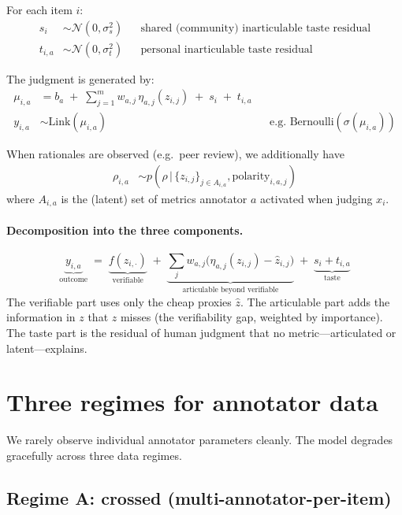 \documentclass[11pt]{article}
\newcommand{\given}{\,|\,}
\begin{document}
For each item $i$:
\begin{align}
s_i &\sim \mathcal{N}(0, \sigma_s^2) && \text{shared (community) inarticulable taste residual} \\
t_{i,a} &\sim \mathcal{N}(0, \sigma_t^2) && \text{personal inarticulable taste residual}
\end{align}

The judgment is generated by:
\begin{align}
\mu_{i,a} &= b_a \;+\; \sum_{j=1}^m w_{a,j}\,\eta_{a,j}(z_{i,j}) \;+\; s_i \;+\; t_{i,a} \\
y_{i,a} &\sim \text{Link}(\mu_{i,a}) && \text{e.g.\ Bernoulli}(\sigma(\mu_{i,a}))
\end{align}

When rationales are observed (e.g.\ peer review), we additionally have
\begin{align}
\rho_{i,a} &\sim p(\rho \given \{z_{i,j}\}_{j \in A_{i,a}}, \text{polarity}_{i,a,j})
\end{align}
where $A_{i,a}$ is the (latent) set of metrics annotator $a$ activated when judging $x_i$.

\paragraph{Decomposition into the three components.}
\[
\underbrace{y_{i,a}}_{\text{outcome}}
\;=\;
\underbrace{f(\hat z_{i,\cdot})}_{\text{verifiable}}
\;+\;
\underbrace{\sum_j w_{a,j}\bigl(\eta_{a,j}(z_{i,j}) - \hat z_{i,j}\bigr)}_{\text{articulable beyond verifiable}}
\;+\;
\underbrace{s_i + t_{i,a}}_{\text{taste}}
\]
The verifiable part uses only the cheap proxies $\hat z$. The articulable part adds the
information in $z$ that $\hat z$ misses (the verifiability gap, weighted by importance). The
taste part is the residual of human judgment that no metric---articulated or
latent---explains.

\section{Three regimes for annotator data}

We rarely observe individual annotator parameters cleanly. The model degrades gracefully
across three data regimes.

\subsection{Regime A: crossed (multi-annotator-per-item)}
\end{document}
